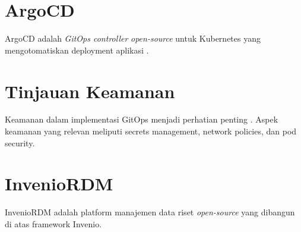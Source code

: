 \section{ArgoCD}

ArgoCD adalah \textit{GitOps controller} \textit{open-source} untuk Kubernetes yang mengotomatiskan deployment aplikasi \citep{argocd-docs}.

\section{Tinjauan Keamanan}

Keamanan dalam implementasi GitOps menjadi perhatian penting \citep{gitops-security}. Aspek keamanan yang relevan meliputi secrets management, network policies, dan pod security.

\section{InvenioRDM}

InvenioRDM adalah platform manajemen data riset \textit{open-source} yang dibangun di atas framework Invenio.
